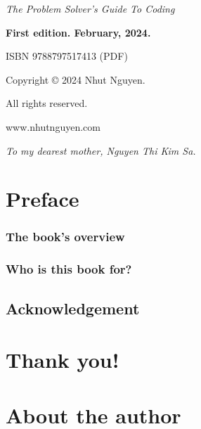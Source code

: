 
\usepackage[paperwidth=7.5in,paperheight=9.25in]{geometry}

\date{February, 2024}
% 
\frontmatter


\textit{The Problem Solver's Guide To Coding} 

\textbf{First edition. February, 2024.} 

ISBN 9788797517413 (PDF)

Copyright © 2024 Nhut Nguyen.

All rights reserved.

www.nhutnguyen.com

\newpage
\begin{center}
    \textit{To my dearest mother, Nguyen Thi Kim Sa.}
\end{center}

\sphinxstepscope



\chapter*{Preface}

\subsection*{The book’s overview}

\subsection*{Who is this book for?}

\section*{Acknowledgement}

\newpage




\mainmatter


\newpage


\appendix

\pagestyle{plain}
\backmatter
\chapter*{Thank you!}


\chapter*{About the author}

